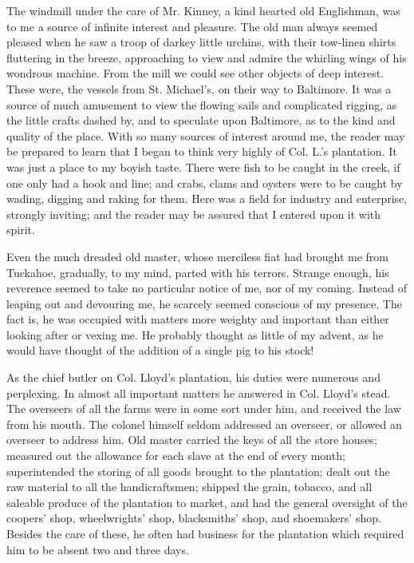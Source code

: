The windmill under the care of Mr. Kinney, a kind hearted old
Englishman, was to me a source of infinite interest and pleasure. The
old man always seemed pleased when he saw a troop of darkey little
urchins, with their tow-linen shirts fluttering in the breeze,
approaching to view and admire the whirling wings of his wondrous
machine. From the mill we could see other objects of deep interest.
These were, {\protect\hypertarget{73}{}{}}the vessels from St.
Michael's, on their way to Baltimore. It was a source of much amusement
to view the flowing sails and complicated rigging, as the little crafts
dashed by, and to speculate upon Baltimore, as to the kind and quality
of the place. With so many sources of interest around me, the reader may
be prepared to learn that I began to think very highly of Col. L.'s
plantation. It was just a place to my boyish taste. There were fish to
be caught in the creek, if one only had a hook and line; and crabs,
clams and oysters were to be caught by wading, digging and raking for
them. Here was a field for industry and enterprise, strongly inviting;
and the reader may be assured that I entered upon it with spirit.

Even the much dreaded old master, whose merciless fiat had brought me
from Tuckahoe, gradually, to my mind, parted with his terrors. Strange
enough, his reverence seemed to take no particular notice of me, nor of
my coming. Instead of leaping out and devouring me, he scarcely seemed
conscious of my presence. The fact is, he was occupied with matters more
weighty and important than either looking after or vexing me. He
probably thought as little of my advent, as he would have thought of the
addition of a single pig to his stock!

As the chief butler on Col. Lloyd's plantation, his duties were numerous
and perplexing. In almost all important matters he answered in Col.
Lloyd's stead. The overseers of all the farms were in some sort under
him, and received the law from his mouth. The colonel himself seldom
addressed an overseer, or {\protect\hypertarget{74}{}{}}allowed an
overseer to address him. Old master carried the keys of all the store
houses; measured out the allowance for each slave at the end of every
month; superintended the storing of all goods brought to the plantation;
dealt out the raw material to all the handicraftsmen; shipped the grain,
tobacco, and all saleable produce of the plantation to market, and had
the general oversight of the coopers' shop, wheelwrights' shop,
blacksmiths' shop, and shoemakers' shop. Besides the care of these, he
often had business for the plantation which required him to be absent
two and three days.

